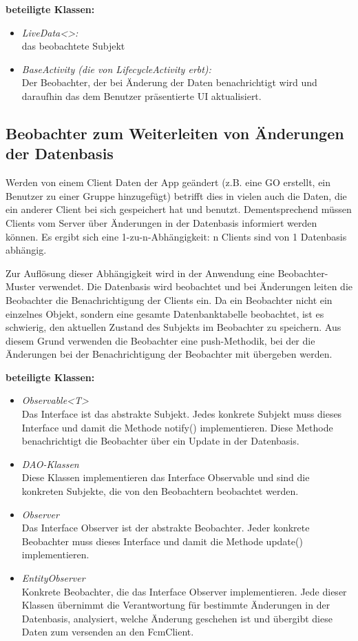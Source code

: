 \documentclass[11pt,a4paper]{article}
\begin{document}
\textbf{beteiligte Klassen:}
\begin{itemize}
	\item \textit{LiveData<>:}\\ das beobachtete Subjekt
	\item \textit{BaseActivity (die von LifecycleActivity erbt):}\\ Der Beobachter, der bei Änderung der Daten benachrichtigt wird und daraufhin das dem Benutzer präsentierte UI aktualisiert.
\end{itemize}

\subsection{Beobachter zum Weiterleiten von Änderungen der Datenbasis}
Werden von einem Client Daten der App geändert (z.B. eine GO erstellt, ein Benutzer zu einer Gruppe hinzugefügt) betrifft dies in vielen auch die Daten, die ein anderer Client bei sich gespeichert hat und benutzt. Dementsprechend müssen Clients vom Server über Änderungen in der Datenbasis informiert werden können. Es ergibt sich eine 1-zu-n-Abhängigkeit: n Clients sind von 1 Datenbasis abhängig.

Zur Auflösung dieser Abhängigkeit wird in der Anwendung eine Beobachter-Muster verwendet. Die Datenbasis wird beobachtet und bei Änderungen leiten die Beobachter die Benachrichtigung der Clients
ein. Da ein Beobachter nicht ein einzelnes Objekt, sondern eine gesamte Datenbanktabelle beobachtet, ist es schwierig, den aktuellen Zustand des Subjekts im Beobachter zu speichern. Aus diesem Grund verwenden die Beobachter eine push-Methodik, bei der die Änderungen bei der Benachrichtigung der Beobachter mit übergeben werden.

\textbf{beteiligte Klassen:}
\begin{itemize}
	\item \textit{Observable<T>}\\ Das Interface ist das abstrakte Subjekt. Jedes konkrete Subjekt muss dieses Interface und damit die Methode notify() implementieren. Diese Methode benachrichtigt die Beobachter über ein Update in der Datenbasis.
	\item \textit{DAO-Klassen}\\ Diese Klassen implementieren das Interface Observable und sind die konkreten Subjekte, die von den Beobachtern beobachtet werden.
	\item \textit{Observer}\\ Das Interface Observer ist der abstrakte Beobachter. Jeder konkrete Beobachter muss dieses Interface und damit die Methode update() implementieren.
	\item \textit{EntityObserver}\\Konkrete Beobachter, die das Interface Observer implementieren. Jede dieser Klassen übernimmt die Verantwortung für bestimmte Änderungen in der Datenbasis, analysiert, welche Änderung geschehen ist und übergibt diese Daten zum versenden an den FcmClient.
\end{itemize}
\end{document}

